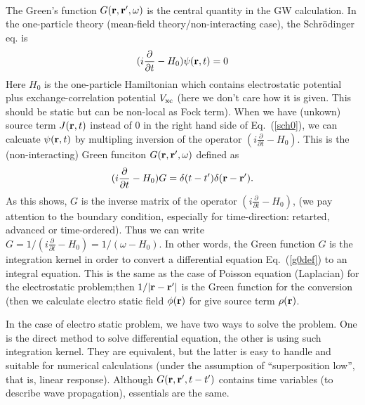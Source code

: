 \documentclass[a4paper,10pt,epsf,fleqn]{article}
\newcommand{\bfr}{{\bf r}}
\newcommand{\req}[1]{\mbox{Eq.~(\ref{#1})}}
\begin{document}
 \\%
The Green's function $G(\bfr,\bfr',\omega)$ is the central quantity in
the GW calculation. 
In the one-particle theory (mean-field theory/non-interacting
case), the Schr\"odinger eq. is
\begin{eqnarray}
(i \frac{\partial }{\partial t} - H_0) \psi(\bfr,t)=0 \label{sch0}
\end{eqnarray}
Here $H_0$ is the 
one-particle Hamiltonian which contains electrostatic potential
plus exchange-correlation potential $V_{\rm xc}$
(here we don't care how it is given. This should be static but can be
non-local as Fock term).
When we have (unkown) source term $J(\bfr,t)$ instead of 0
in the right hand side of \req{sch0},
we can calcuate $\psi(\bfr,t)$ by multipling inversion of
the operator $(i \frac{\partial }{\partial t} - H_0)$.
This is the (non-interacting) Green funciton $G(\bfr,\bfr',\omega)$ defined as
\begin{eqnarray}
(i \frac{\partial }{\partial t} - H_0) G
= \delta(t-t')\delta(\bfr-\bfr'). \label{g0def}
\end{eqnarray}
As this shows, $G$ is the inverse matrix of 
the operator $(i \frac{\partial }{\partial t} - H_0)$,
(we pay attention to the boundary condition, 
especially for time-direction: retarted, advanced or
time-ordered). Thus we can write 
$G=1/(i \frac{\partial }{\partial t} -H_0)=1/(\omega -H_0)$.
In other words, the Green function $G$ is the integration kernel
in order to convert a differential equation \req{g0def} to an integral
equation. This is the same as the case of Poisson equation
(Laplacian) for the electrostatic problem;then $1/|\bfr-\bfr'|$
is the Green function for the conversion (then we calculate electro
static field $\phi(\bfr)$ for give source term $\rho(\bfr)$.
 
In the case of electro static problem, we have two ways to solve the
problem. One is the direct method to solve differential equation,
the other is using such integration kernel. They are equivalent, but the
latter is easy to handle and suitable for numerical calculations
(under the assumption of ``superposition low'', that is, linear response).
Although $G(\bfr,\bfr', t-t')$ contains time variables (to describe wave
propagation), essentials are the same.\\
\end{document}
